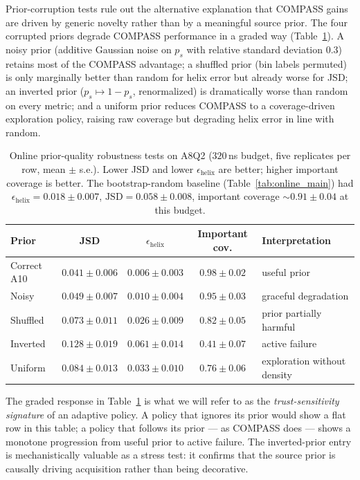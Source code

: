 \documentclass[journal=jctcce,manuscript=article,layout=twocolumn]{achemso}
\begin{document}
Prior-corruption tests rule out the alternative explanation that COMPASS gains are driven by generic novelty rather than by a meaningful source prior. The four corrupted priors degrade COMPASS performance in a graded way (Table~\ref{tab:online_prior_quality}). A noisy prior (additive Gaussian noise on $p_s$ with relative standard deviation $0.3$) retains most of the COMPASS advantage; a shuffled prior (bin labels permuted) is only marginally better than random for helix error but already worse for JSD; an inverted prior ($p_s\mapsto 1-p_s$, renormalized) is dramatically worse than random on every metric; and a uniform prior reduces COMPASS to a coverage-driven exploration policy, raising raw coverage but degrading helix error in line with random.

\begin{table}[htbp]
    \centering
    \caption{Online prior-quality robustness tests on A8Q2 ($320$\,ns budget, five replicates per row, mean $\pm$ s.e.). Lower JSD and lower $\epsilon_{\mathrm{helix}}$ are better; higher important coverage is better. The bootstrap-random baseline (Table~\ref{tab:online_main}) had $\epsilon_{\mathrm{helix}}=0.018\pm 0.007$, $\mathrm{JSD}=0.058\pm 0.008$, important coverage $\sim 0.91\pm 0.04$ at this budget.}
    \label{tab:online_prior_quality}
    \begin{tabular}{lcccl}
        \toprule
        Prior & JSD & $\epsilon_{\mathrm{helix}}$ & Important cov. & Interpretation \\
        \midrule
        Correct A10 & $0.041\pm 0.006$ & $0.006\pm 0.003$ & $0.98\pm 0.02$ & useful prior \\
        Noisy & $0.049\pm 0.007$ & $0.010\pm 0.004$ & $0.95\pm 0.03$ & graceful degradation \\
        Shuffled & $0.073\pm 0.011$ & $0.026\pm 0.009$ & $0.82\pm 0.05$ & prior partially harmful \\
        Inverted & $0.128\pm 0.019$ & $0.061\pm 0.014$ & $0.41\pm 0.07$ & active failure \\
        Uniform & $0.084\pm 0.013$ & $0.033\pm 0.010$ & $0.76\pm 0.06$ & exploration without density \\
        \bottomrule
    \end{tabular}
\end{table}

The graded response in Table~\ref{tab:online_prior_quality} is what we will refer to as the \emph{trust-sensitivity signature} of an adaptive policy. A policy that ignores its prior would show a flat row in this table; a policy that follows its prior --- as COMPASS does --- shows a monotone progression from useful prior to active failure. The inverted-prior entry is mechanistically valuable as a stress test: it confirms that the source prior is causally driving acquisition rather than being decorative.
\end{document}
